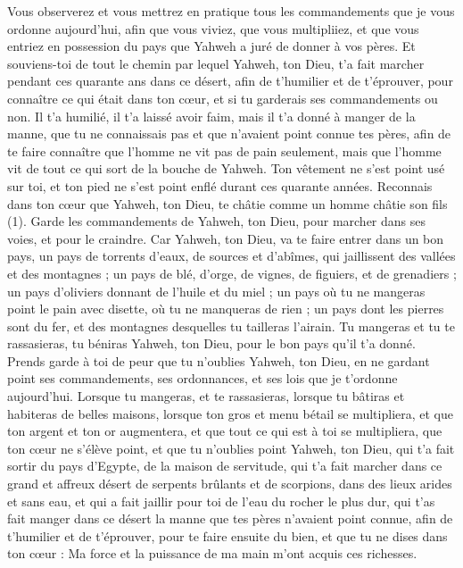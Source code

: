 \begin{multicols}{2}
\VerseOne{}Vous observerez et vous mettrez en pratique tous les commandements que je vous ordonne aujourd'hui, afin que vous viviez, que vous multipliiez, et que vous entriez en possession du pays que Yahweh a juré de donner à vos pères.
Et souviens-toi de tout le chemin par lequel Yahweh, ton Dieu, t'a fait marcher pendant ces quarante ans dans ce désert, afin de t'humilier et de t'éprouver, pour connaître ce qui était dans ton cœur, et si tu garderais ses commandements ou non.
Il t'a humilié, il t'a laissé avoir faim, mais il t'a donné à manger de la manne, que tu ne connaissais pas et que n’avaient point connue tes pères, afin de te faire connaître que l'homme ne vit pas de pain seulement, mais que l'homme vit de tout ce qui sort de la bouche de Yahweh.
Ton vêtement ne s'est point usé sur toi, et ton pied ne s’est point enflé durant ces quarante années.
Reconnais dans ton cœur que Yahweh, ton Dieu, te châtie comme un homme châtie son fils (1).
Garde les commandements de Yahweh, ton Dieu, pour marcher dans ses voies, et pour le craindre.
Car Yahweh, ton Dieu, va te faire entrer dans un bon pays, un pays de torrents d'eaux, de sources et d'abîmes, qui jaillissent des vallées et des montagnes ;
un pays de blé, d'orge, de vignes, de figuiers, et de grenadiers ; un pays d'oliviers donnant de l'huile et du miel ;
un pays où tu ne mangeras point le pain avec disette, où tu ne manqueras de rien ; un pays dont les pierres sont du fer, et des montagnes desquelles tu tailleras l'airain.
Tu mangeras et tu te rassasieras, tu béniras Yahweh, ton Dieu, pour le bon pays qu'il t'a donné.
Prends garde à toi de peur que tu n'oublies Yahweh, ton Dieu, en ne gardant point ses commandements, ses ordonnances, et ses lois que je t’ordonne aujourd'hui.
Lorsque tu mangeras, et te rassasieras, lorsque tu bâtiras et habiteras de belles maisons,
lorsque ton gros et menu bétail se multipliera, et que ton argent et ton or augmentera, et que tout ce qui est à toi se multipliera,
que ton cœur ne s'élève point, et que tu n'oublies point Yahweh, ton Dieu, qui t’a fait sortir du pays d'Egypte, de la maison de servitude,
qui t'a fait marcher dans ce grand et affreux désert de serpents brûlants et de scorpions, dans des lieux arides et sans eau, et qui a fait jaillir pour toi de l'eau du rocher le plus dur,
qui t’as fait manger dans ce désert la manne que tes pères n'avaient point connue, afin de t'humilier et de t'éprouver, pour te faire ensuite du bien,
et que tu ne dises dans ton cœur : Ma force et la puissance de ma main m'ont acquis ces richesses.

\end{multicols}
